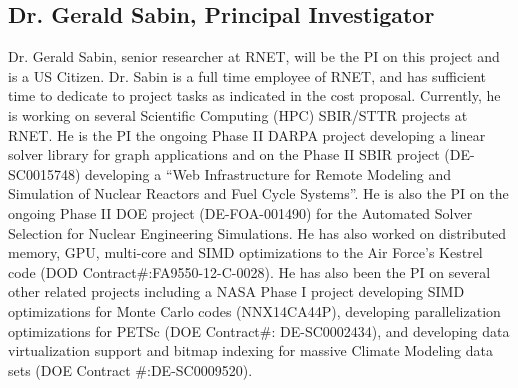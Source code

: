 \subsection{Dr. Gerald Sabin, Principal Investigator}
Dr. Gerald Sabin, senior researcher at RNET, will be the PI on this project and is a US Citizen.  Dr.  Sabin is a full time employee of RNET, and has
sufficient time to dedicate to project tasks as indicated in the cost
proposal. Currently, he is working on several Scientific Computing (HPC) 
SBIR/STTR projects at RNET. He is the PI the 
ongoing Phase II DARPA project developing a linear solver library for graph applications  and on the Phase II SBIR project 
(DE-SC0015748) developing a ``Web Infrastructure for Remote Modeling and
Simulation of Nuclear Reactors and Fuel Cycle Systems''. He is also the PI on the 
ongoing Phase II DOE project (DE-FOA-001490) for the Automated Solver Selection for Nuclear Engineering 
Simulations. He has also worked on distributed memory, GPU, multi-core and SIMD 
optimizations to the Air Force's Kestrel code (DOD Contract\#:FA9550-12-C-0028). He has also been the PI on several other
related projects including a NASA Phase I project developing SIMD
optimizations for Monte Carlo codes (NNX14CA44P), developing
parallelization optimizations for PETSc (DOE Contract\#:
DE-SC0002434), and developing data virtualization support and bitmap
indexing for massive Climate Modeling data sets (DOE Contract
\#:DE-SC0009520).



